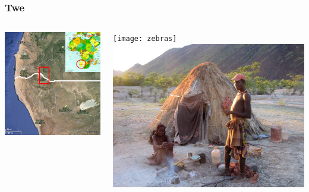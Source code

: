 \documentclass{beamer}
\begin{document}
\begin{frame}

\frametitle{Twe}

\begin{columns}
\begin{column}{.5\textwidth}
\includegraphics[width= .9\textwidth]{bigmap}
\end{column}

\begin{column}{.5\textwidth}
\texttt{[image: zebras]}
\vspace{0.15cm}
\includegraphics[width= .8\textwidth]{twe_couple}
\end{column}

\end{columns}

\end{frame}
\end{document}
